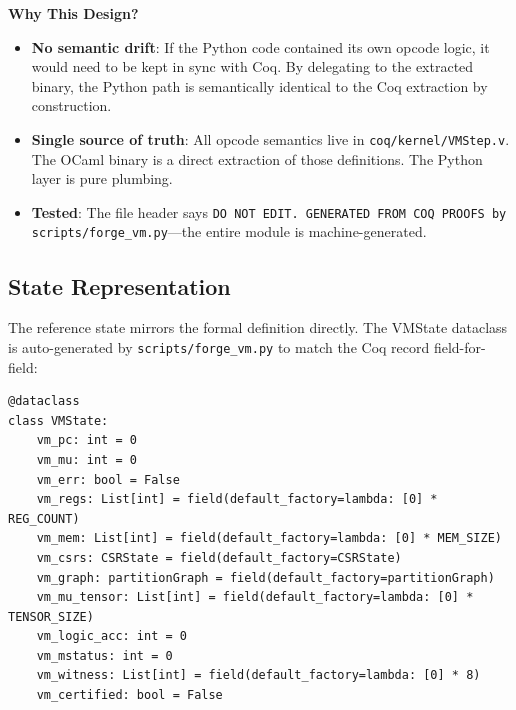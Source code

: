 \textbf{Why This Design?}
\begin{itemize}
    \item \textbf{No semantic drift}: If the Python code contained its own opcode logic, it would need to be kept in sync with Coq. By delegating to the extracted binary, the Python path is semantically identical to the Coq extraction by construction.
    \item \textbf{Single source of truth}: All opcode semantics live in \texttt{coq/kernel/VMStep.v}. The OCaml binary is a direct extraction of those definitions. The Python layer is pure plumbing.
    \item \textbf{Tested}: The file header says \texttt{DO NOT EDIT. GENERATED FROM COQ PROOFS by scripts/forge\_vm.py}---the entire module is machine-generated.
\end{itemize}

\subsection{State Representation}

The reference state mirrors the formal definition directly. The VMState dataclass is auto-generated by \texttt{scripts/forge\_vm.py} to match the Coq record field-for-field:
\begin{lstlisting}
@dataclass
class VMState:
    vm_pc: int = 0
    vm_mu: int = 0
    vm_err: bool = False
    vm_regs: List[int] = field(default_factory=lambda: [0] * REG_COUNT)
    vm_mem: List[int] = field(default_factory=lambda: [0] * MEM_SIZE)
    vm_csrs: CSRState = field(default_factory=CSRState)
    vm_graph: partitionGraph = field(default_factory=partitionGraph)
    vm_mu_tensor: List[int] = field(default_factory=lambda: [0] * TENSOR_SIZE)
    vm_logic_acc: int = 0
    vm_mstatus: int = 0
    vm_witness: List[int] = field(default_factory=lambda: [0] * 8)
    vm_certified: bool = False
\end{lstlisting}

